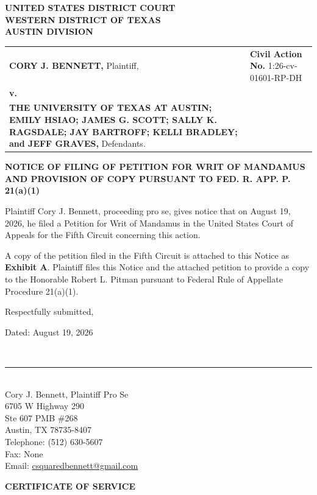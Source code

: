 \documentclass[12pt]{article}
\makeatletter
\newcommand{\NoticeCaption}{%
  \begin{singlespace}
  \begin{center}
  \textbf{UNITED STATES DISTRICT COURT}\\
  \textbf{WESTERN DISTRICT OF TEXAS}\\
  \textbf{AUSTIN DIVISION}
  \end{center}

  \vspace{0.45em}

  \noindent
  \begin{tabularx}{\textwidth}{@{}>{\raggedright\arraybackslash}X>{\raggedright\arraybackslash}p{2.95in}@{}}
  \textbf{CORY J. BENNETT,} Plaintiff, & \textbf{Civil Action No.} 1:26-cv-01601-RP-DH \\
  \textbf{v.} & \\
  \textbf{THE UNIVERSITY OF TEXAS AT AUSTIN; EMILY HSIAO; JAMES G. SCOTT; SALLY K. RAGSDALE; JAY BARTROFF; KELLI BRADLEY; and JEFF GRAVES,} Defendants. & \\
  \end{tabularx}

  \vspace{1.0em}
  \end{singlespace}%
}
\makeatother
\begin{document}
\NoticeCaption

\begin{singlespace}
\begin{center}
\textbf{NOTICE OF FILING OF PETITION FOR WRIT OF MANDAMUS
AND PROVISION OF COPY PURSUANT TO FED. R. APP. P. 21(a)(1)}
\end{center}
\end{singlespace}

Plaintiff Cory J. Bennett, proceeding pro se, gives notice that on August 19, 2026, he filed a Petition for Writ of Mandamus in the United States Court of Appeals for the Fifth Circuit concerning this action.

A copy of the petition filed in the Fifth Circuit is attached to this Notice as \textbf{Exhibit A}. Plaintiff files this Notice and the attached petition to provide a copy to the Honorable Robert L. Pitman pursuant to Federal Rule of Appellate Procedure 21(a)(1).



\singlespacing
\vspace{0.6em}
\noindent Respectfully submitted,

\vspace{0.25em}
\noindent Dated: August 19, 2026

\vspace{0.35em}
\noindent\makebox[3.2in][l]{\SignatureFourOnLine[width=1.5in]}\\[-0.35em]
\rule{3.2in}{0.4pt}\\
Cory J. Bennett, Plaintiff Pro Se\\
6705 W Highway 290\\
Ste 607 PMB \#268\\
Austin, TX 78735-8407\\
Telephone: (512) 630-5607\\
Fax: None\\
Email: \href{mailto:csquaredbennett@gmail.com}{csquaredbennett@gmail.com}

\clearpage
\begin{center}
\textbf{CERTIFICATE OF SERVICE}
\end{center}
\end{document}
